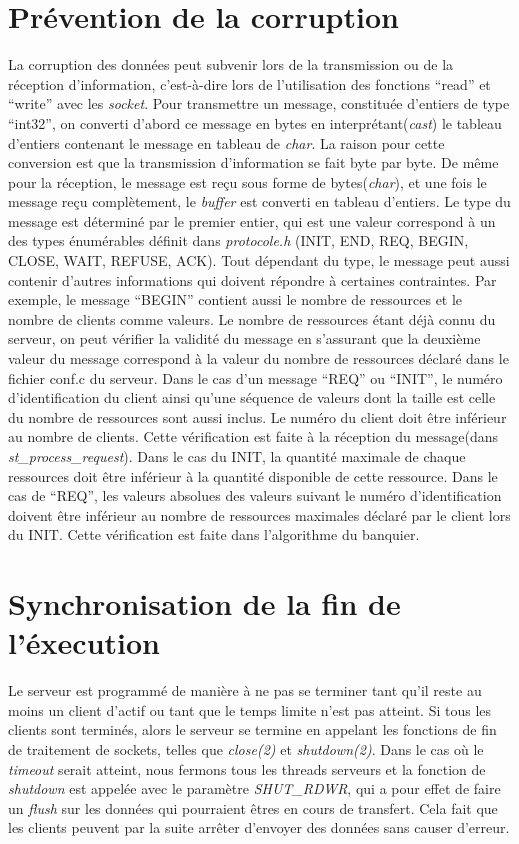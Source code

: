 \documentclass[letterpaper,12pt]{scrartcl}
\begin{document}
\section{Prévention de la corruption}
La corruption des données peut subvenir lors de la transmission ou de la réception d'information,
c'est-à-dire lors de l'utilisation des fonctions ``read'' et ``write'' avec les \emph{socket}.
Pour transmettre un message, constituée d'entiers de type ``int32'', on converti d'abord ce message en bytes en interprétant(\emph{cast})
le tableau d'entiers contenant le message en tableau de \emph{char}. La raison pour cette conversion est que la transmission d'information se fait byte par byte.
De même pour la réception, le message est reçu sous forme de bytes(\emph{char}), et une fois le message reçu complètement,
le \emph{buffer} est converti en tableau d'entiers.
Le type du message est déterminé par le premier entier, qui est une valeur correspond à un des types énumérables définit dans \emph{protocole.h}
(INIT, END, REQ, BEGIN, CLOSE, WAIT, REFUSE, ACK).
Tout dépendant du type, le message peut aussi contenir d'autres informations qui doivent répondre à certaines contraintes.
Par exemple, le message ``BEGIN'' contient aussi le nombre de ressources et le nombre de clients comme valeurs.
Le nombre de ressources étant déjà connu du serveur, on peut vérifier la validité du message en s'assurant que la deuxième valeur du message correspond à la valeur du nombre de ressources déclaré dans le fichier conf.c du serveur.
Dans le cas d'un message ``REQ'' ou ``INIT'', le numéro d'identification du client ainsi qu'une séquence de valeurs dont la taille est celle du nombre de ressources sont aussi inclus.
Le numéro du client doit être inférieur au nombre de clients. Cette vérification est faite à la réception du message(dans \emph{st\_process\_request}).
Dans le cas du INIT, la quantité maximale de chaque ressources doit être inférieur à la quantité disponible de cette ressource.
Dans le cas de ``REQ'', les valeurs absolues des valeurs suivant le numéro d'identification doivent être inférieur au nombre de ressources maximales déclaré par le client lors du INIT. Cette vérification est faite dans l'algorithme du banquier.

\section{Synchronisation de la fin de l'éxecution}
Le serveur est programmé de manière à ne pas se terminer tant qu'il reste au moins un client d'actif ou tant que le temps limite n'est pas atteint. Si tous les clients sont terminés, alors le serveur se termine en appelant les fonctions de fin de traitement de sockets, telles que \textit{close(2)} et \textit{shutdown(2)}. Dans le cas où le \textit{timeout} serait atteint, nous fermons tous les threads serveurs et la fonction de \textit{shutdown} est appelée avec le paramètre \textit{SHUT\_RDWR}, qui a pour effet de faire un \textit{flush} sur les données qui pourraient êtres en cours de transfert. Cela fait que les clients peuvent par la suite arrêter d'envoyer des données sans causer d'erreur.
\end{document}
